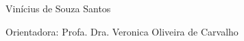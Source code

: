 \begin{folhaderosto}
	\begin{center}		
		\fontsize{14}{14}\selectfont Vinícius de Souza Santos
		\vspace*{\fill}\vspace*{\fill}
		\begin{center}
			\ABNTEXchapterfont\bfseries\Large\imprimirtitulo
		\end{center}
		\vspace*{\fill}
		
		\hspace{.45\textwidth}
		\begin{minipage}{.5\textwidth}
			\SingleSpacing
			\imprimirpreambulo
		\end{minipage}%
		
		\vspace*{1cm}
		\begin{flushright}
			\noindent Orientadora: Profa. Dra. Veronica Oliveira de Carvalho
		\end{flushright}
		\vspace*{1cm}
				
				
		{\large\imprimirlocal}
		\par
		{\large\imprimirdata}
		\vspace*{1cm}
		
	\end{center}
\end{folhaderosto}
